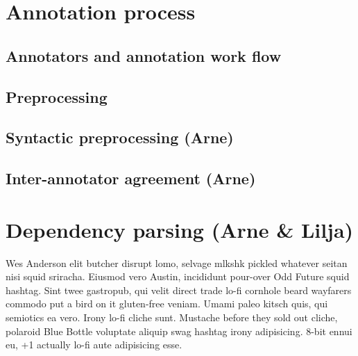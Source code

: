 \documentclass[11pt,a4paper]{article}
\begin{document}
\section{Annotation process}
\subsection{Annotators and annotation work flow}
\subsection{Preprocessing}
\subsection{Syntactic preprocessing (Arne)}

\subsection{Inter-annotator agreement (Arne)}

\section{Dependency parsing (Arne \& Lilja)}
Wes Anderson elit butcher disrupt lomo, selvage mlkshk pickled whatever seitan
nisi squid sriracha. Eiusmod vero Austin, incididunt pour-over Odd Future
squid hashtag. Sint twee gastropub, qui velit direct trade lo-fi cornhole
beard wayfarers commodo put a bird on it gluten-free veniam. Umami paleo
kitsch quis, qui semiotics ea vero. Irony lo-fi cliche sunt. Mustache before
they sold out cliche, polaroid Blue Bottle voluptate aliquip swag hashtag
irony adipisicing. 8-bit ennui eu, +1 actually lo-fi aute adipisicing esse.

\clearpage

\end{document}
